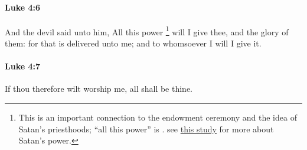 		\paragraph{Luke 4:6} %
			\label{LUKE-4-6}

			And the devil said unto him, All this power%
				\footnote{%
					This is an important connection to the endowment ceremony and the idea of Satan's priesthoods; ``all this power'' is . see \hyperref[SATAN-power]{this study} for more about Satan's power. 
					}
			will I give thee, and the glory of them: for that is delivered unto me; and to whomsoever I will I give it.

			\begin{framed}
			\scriptsize
				\begin{compactdesc}
					\item[SBLG]  \hyperref[EXOUSIA]{} 
				\end{compactdesc}
			\end{framed}

		\paragraph{Luke 4:7} %
			\label{LUKE-4-7}

			If thou therefore wilt worship me, all shall be thine.

